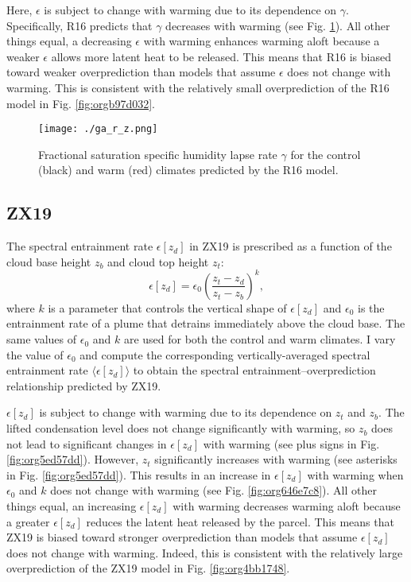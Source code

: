 \documentclass[11pt]{article}
\begin{document}
Here, \(\epsilon\) is subject to change with warming due to its dependence on \(\gamma\). Specifically, R16 predicts that \(\gamma\) decreases with warming (see Fig. \ref{fig:orge395c42}). All other things equal, a decreasing \(\epsilon\) with warming enhances warming aloft because a weaker \(\epsilon\) allows more latent heat to be released. This means that R16 is biased toward weaker overprediction than models that assume \(\epsilon\) does not change with warming. This is consistent with the relatively small overprediction of the R16 model in Fig. \ref{fig:orgb97d032}.

\begin{figure}[htbp]
\centering
\texttt{[image: ./ga\_r\_z.png]}
\caption{\label{fig:orge395c42}Fractional saturation specific humidity lapse rate \(\gamma\) for the control (black) and warm (red) climates predicted by the R16 model.}
\end{figure}

\subsection*{ZX19}
\label{sec:org976cbae}
The spectral entrainment rate \(\epsilon[z_d]\) in ZX19 is prescribed as a function of the cloud base height \(z_b\) and cloud top height \(z_t\):
\begin{equation}
\label{eq:org2c27d6d}
\epsilon[z_d] = \epsilon_0 \left(\frac{z_t-z_d}{z_t-z_b}\right)^{k},
\end{equation}
where \(k\) is a parameter that controls the vertical shape of \(\epsilon[z_d]\) and \(\epsilon_0\) is the entrainment rate of a plume that detrains immediately above the cloud base. The same values of \(\epsilon_0\) and \(k\) are used for both the control and warm climates. I vary the value of \(\epsilon_0\) and compute the corresponding vertically-averaged spectral entrainment rate \(\langle \epsilon[z_d] \rangle\) to obtain the spectral entrainment--overprediction relationship predicted by ZX19.

\(\epsilon[z_d]\) is subject to change with warming due to its dependence on \(z_t\) and \(z_b\). The lifted condensation level does not change significantly with warming, so \(z_b\) does not lead to significant changes in \(\epsilon[z_d]\) with warming (see plus signs in Fig. \ref{fig:org5ed57dd}). However, \(z_t\) significantly increases with warming (see asterisks in Fig. \ref{fig:org5ed57dd}). This results in an increase in \(\epsilon[z_d]\) with warming when \(\epsilon_0\) and \(k\) does not change with warming (see Fig. \ref{fig:org646e7c8}). All other things equal, an increasing \(\epsilon[z_d]\) with warming decreases warming aloft because a greater \(\epsilon[z_d]\) reduces the latent heat released by the parcel. This means that ZX19 is biased toward stronger overprediction than models that assume \(\epsilon[z_d]\) does not change with warming. Indeed, this is consistent with the relatively large overprediction of the ZX19 model in Fig. \ref{fig:org4bb1748}.
\end{document}
